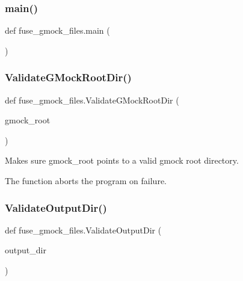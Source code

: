 \subsubsection{\texorpdfstring{main()}{main()}}
{\footnotesize\ttfamily def fuse\+\_\+gmock\+\_\+files.\+main (\begin{DoxyParamCaption}{ }\end{DoxyParamCaption})}

\mbox{\label{namespacefuse__gmock__files_aaec09f55a62b3d65b5d25fe0050e9e05}} 
\subsubsection{\texorpdfstring{Validate\+G\+Mock\+Root\+Dir()}{ValidateGMockRootDir()}}
{\footnotesize\ttfamily def fuse\+\_\+gmock\+\_\+files.\+Validate\+G\+Mock\+Root\+Dir (\begin{DoxyParamCaption}\item[{}]{gmock\+\_\+root }\end{DoxyParamCaption})}

\begin{DoxyVerb}Makes sure gmock_root points to a valid gmock root directory.

The function aborts the program on failure.
\end{DoxyVerb}
 \mbox{\label{namespacefuse__gmock__files_a68581e210793099d656537faa719df29}} 
\subsubsection{\texorpdfstring{Validate\+Output\+Dir()}{ValidateOutputDir()}}
{\footnotesize\ttfamily def fuse\+\_\+gmock\+\_\+files.\+Validate\+Output\+Dir (\begin{DoxyParamCaption}\item[{}]{output\+\_\+dir }\end{DoxyParamCaption})}

